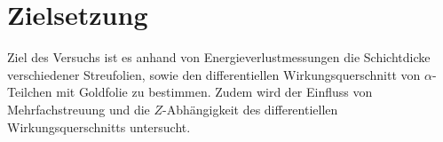 \section{Zielsetzung}
\label{sec:Zielsetzung}

Ziel des Versuchs ist es anhand von Energieverlustmessungen die Schichtdicke verschiedener Streufolien, sowie den differentiellen Wirkungsquerschnitt von $\alpha$-Teilchen mit Goldfolie zu bestimmen. Zudem wird der Einfluss von Mehrfachstreuung und die $Z$-Abhängigkeit des differentiellen Wirkungsquerschnitts untersucht.